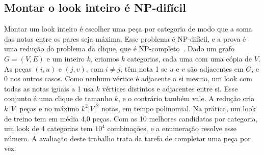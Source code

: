 \subsection{Montar o look inteiro é NP-difícil}

Montar um look inteiro é escolher uma peça por categoria de modo que a soma das notas entre os pares seja máxima. Esse problema é NP-difícil, e a prova é uma redução do problema da clique, que é NP-completo~\cite{karp1972}. Dado um grafo $G = (V, E)$ e um inteiro $k$, criamos $k$ categorias, cada uma com uma cópia de $V$. As peças $(i, u)$ e $(j, v)$, com $i \neq j$, têm nota 1 se $u$ e $v$ são adjacentes em $G$, e 0 nos outros casos. Como nenhum vértice é adjacente a si mesmo, um look com todas as notas iguais a 1 usa $k$ vértices distintos e adjacentes entre si. Esse conjunto é uma clique de tamanho $k$, e o contrário também vale. A redução cria $k\,|V|$ peças e no máximo $k^2 |V|^2$ notas, em tempo polinomial. Na prática, um look de treino tem em média 4,0 peças. Com as 10 melhores candidatas por categoria, um look de 4 categorias tem $10^4$ combinações, e a enumeração resolve esse número. A avaliação deste trabalho trata da tarefa de completar uma peça por vez.
